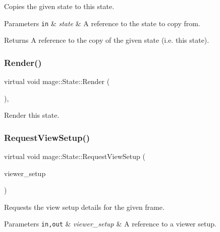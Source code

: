 Copies the given state to this state.


\begin{DoxyParams}[1]{Parameters}
\mbox{\tt in}  & {\em state} & A reference to the state to copy from. \\
\hline
\end{DoxyParams}
\begin{DoxyReturn}{Returns}
A reference to the copy of the given state (i.\+e. this state). 
\end{DoxyReturn}
\hypertarget{classmage_1_1_state_a6e3b3f55bfd5be86a02783a2f76c9709}{}\label{classmage_1_1_state_a6e3b3f55bfd5be86a02783a2f76c9709} 
\subsubsection{\texorpdfstring{Render()}{Render()}}
{\footnotesize\ttfamily virtual void mage\+::\+State\+::\+Render (\begin{DoxyParamCaption}{ }\end{DoxyParamCaption})\hspace{0.3cm}{\ttfamily [protected]}, {\ttfamily [virtual]}}

Render this state. \hypertarget{classmage_1_1_state_a22274e1bc87f6b8883cddfb05e35f120}{}\label{classmage_1_1_state_a22274e1bc87f6b8883cddfb05e35f120} 
\subsubsection{\texorpdfstring{Request\+View\+Setup()}{RequestViewSetup()}}
{\footnotesize\ttfamily virtual void mage\+::\+State\+::\+Request\+View\+Setup (\begin{DoxyParamCaption}\item[{\hyperlink{structmage_1_1_viewer_setup}{Viewer\+Setup} \&}]{viewer\+\_\+setup }\end{DoxyParamCaption})\hspace{0.3cm}{\ttfamily [virtual]}}

Requests the view setup details for the given frame.


\begin{DoxyParams}[1]{Parameters}
\mbox{\tt in,out}  & {\em viewer\+\_\+setup} & A reference to a viewer setup. \\
\hline
\end{DoxyParams}
\hypertarget{classmage_1_1_state_afbee8caa84e0c69ac5757f7e5e87317f}{}\label{classmage_1_1_state_afbee8caa84e0c69ac5757f7e5e87317f} 
